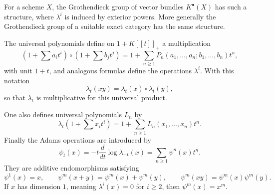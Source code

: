 \documentclass[13pt]{extarticle}
\begin{document}
For a scheme $X$, the Grothendieck group of vector bundles $K^{\bullet}(X)$ has such a structure, where $\lambda^i$ is induced by exterior powers. More generally the Grothendieck group of a suitable exact category has the same structure.

The universal polynomials define on $1+K[[t]]_+$ a multiplication
\[
(1+\sum a_it^i)\circ(1+\sum b_jt^j)
=1+\sum_{n\ge1}P_n(a_1,\ldots,a_n;b_1,\ldots,b_n)t^n,
\]
with unit $1+t$, and analogous formulas define the operations $\lambda^i$. With this notation
\[
\lambda_t(xy)=\lambda_t(x)\circ\lambda_t(y),
\]
so that $\lambda_t$ is multiplicative for this universal product.

One also defines universal polynomials $L_n$ by
\[
\lambda_t(1+\sum x_it^i)=1+\sum_{n\ge1}L_n(x_1,\ldots,x_n)t^n.
\]
Finally the Adams operations are introduced by
\[
\psi_t(x)=-t\frac{d}{dt}\log\lambda_{-t}(x)=\sum_{n\ge1}\psi^n(x)t^n.
\]
They are additive endomorphisms satisfying
\[
\psi^1(x)=x,
\qquad
\psi^m(x+y)=\psi^m(x)+\psi^m(y),
\qquad
\psi^m(xy)=\psi^m(x)\psi^m(y).
\]
If $x$ has dimension $1$, meaning $\lambda^i(x)=0$ for $i\ge2$, then $\psi^m(x)=x^m$.
\end{document}
